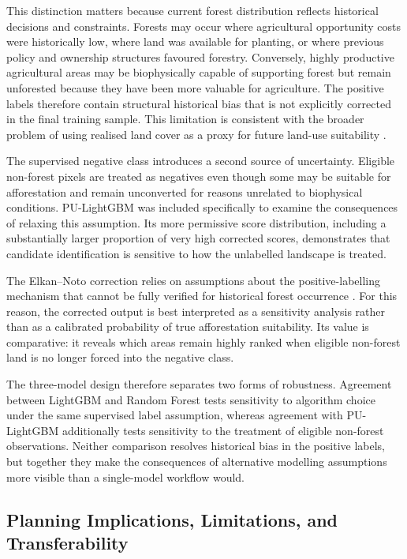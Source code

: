 \documentclass[land,article,submit,moreauthors]{Definitions/mdpi}
\begin{document}
This distinction matters because current forest distribution reflects historical decisions and constraints. Forests may occur where agricultural opportunity costs were historically low, where land was available for planting, or where previous policy and ownership structures favoured forestry. Conversely, highly productive agricultural areas may be biophysically capable of supporting forest but remain unforested because they have been more valuable for agriculture. The positive labels therefore contain structural historical bias that is not explicitly corrected in the final training sample. This limitation is consistent with the broader problem of using realised land cover as a proxy for future land-use suitability \citep{chen2019,buthelezi2024review}.

The supervised negative class introduces a second source of uncertainty. Eligible non-forest pixels are treated as negatives even though some may be suitable for afforestation and remain unconverted for reasons unrelated to biophysical conditions. PU-LightGBM was included specifically to examine the consequences of relaxing this assumption. Its more permissive score distribution, including a substantially larger proportion of very high corrected scores, demonstrates that candidate identification is sensitive to how the unlabelled landscape is treated.

The Elkan--Noto correction relies on assumptions about the positive-labelling mechanism that cannot be fully verified for historical forest occurrence \citep{elkan2008,bekker2020}. For this reason, the corrected output is best interpreted as a sensitivity analysis rather than as a calibrated probability of true afforestation suitability. Its value is comparative: it reveals which areas remain highly ranked when eligible non-forest land is no longer forced into the negative class.

The three-model design therefore separates two forms of robustness. Agreement between LightGBM and Random Forest tests sensitivity to algorithm choice under the same supervised label assumption, whereas agreement with PU-LightGBM additionally tests sensitivity to the treatment of eligible non-forest observations. Neither comparison resolves historical bias in the positive labels, but together they make the consequences of alternative modelling assumptions more visible than a single-model workflow would.

\subsection{Planning Implications, Limitations, and Transferability}
\label{sec:discussion-planning}
\end{document}
